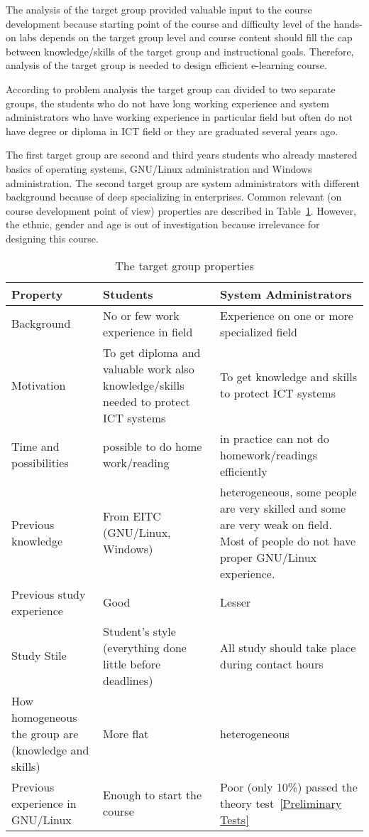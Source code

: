 The analysis of the target group provided valuable input to the course development because starting point of the course and difficulty level of the hands-on labs depends on the target group level and course content should fill the cap between knowledge/skills of the target group and instructional goals. Therefore, analysis of the target group is needed to design efficient e-learning course.

 According to problem analysis the target group can divided to two separate groups, the students who do not have long working experience and system administrators who have working experience in particular field but often do not have degree or diploma in \gls{ICT} field or they are graduated several years ago.

The first target group are second and third years students who already mastered basics of operating systems, GNU/Linux administration and Windows administration. The second target group are system administrators with different background because of deep specializing in enterprises. Common relevant (on course development point of view)  properties are described in Table~\ref{tab:targetgroup}. However, the ethnic, gender and age is out of investigation because irrelevance for designing this course.

\begin{table}[h]
\centering
\caption{The target group properties}

\begin{tabular}{|p{4cm}|p{5cm}|p{5cm}|}
\hline 
\color{blue}
Property & \color{blue} Students & \color{blue} System Administrators \\ 
\hline 
Background & No or few work experience in field & Experience on one or more specialized field \\ 
\hline 
Motivation & To get diploma and valuable work also knowledge/skills needed to protect \gls{ICT} systems & To get knowledge and skills to protect \gls{ICT} systems \\ 
\hline 
Time and possibilities & possible to do home work/reading & in practice can not do homework/readings efficiently  \\ 
\hline 
Previous knowledge & From \gls{EITC} (GNU/Linux, Windows)  &  heterogeneous, some people are very skilled and some are very weak on field. Most of people do not have proper GNU/Linux experience.  \\ 
\hline 
Previous study experience & Good & Lesser \\ 
\hline 
Study Stile & Student's style (everything done little before deadlines) & All study should take place during contact hours  \\ 
\hline 
How homogeneous the group are (knowledge and skills) & More flat & heterogeneous \\ 
\hline 
Previous experience in GNU/Linux & Enough to start the course & Poor (only 10\%) passed the theory test~\ref{Preliminary Tests}  \\ 
\hline 
\end{tabular} 

\label{tab:targetgroup}
\end{table}
 
